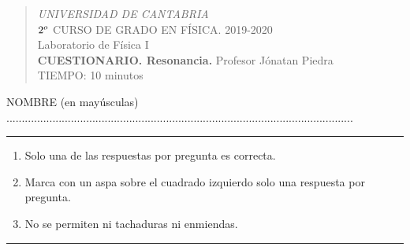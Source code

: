 \documentclass[11pt]{articulo}
\begin{document}
\begin{verse}
{\Large \it  UNIVERSIDAD DE CANTABRIA}\\ 
\vspace*{0.5cm}
{\normalsize \rm $2^{\underline \rm o}$ CURSO DE GRADO EN F\'ISICA.  2019-2020 }\\
{\normalsize \rm  Laboratorio de F\'isica I}\\ 
{\normalsize \rm  {\bf CUESTIONARIO. Resonancia. } Profesor J\'onatan Piedra}\\
{\normalsize \rm  TIEMPO: 10 minutos}\\
\end{verse} 

\vspace*{0.25cm}

NOMBRE (en may\'usculas) .................................................................................................................\\

 
\hrule

{\large \begin{enumerate}
\item Solo una de las respuestas por pregunta es correcta. 
\item Marca con un aspa sobre el cuadrado izquierdo solo una respuesta por pregunta. 
\item No se permiten ni tachaduras ni enmiendas.
\end{enumerate}}
 

\hrule
          
\end{document}

